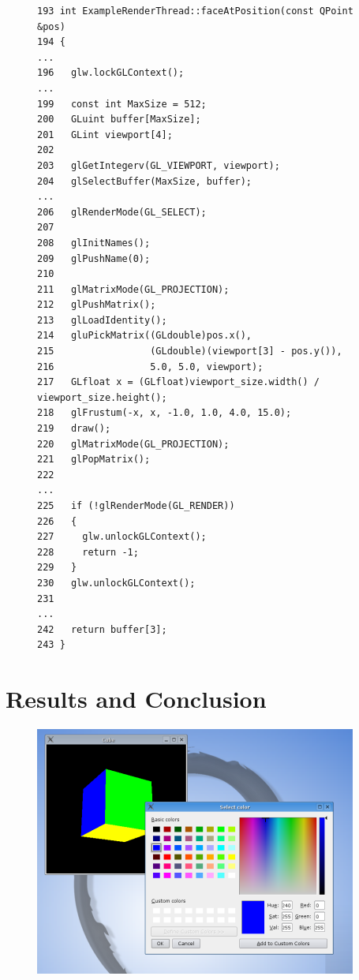 \documentclass[jou,noapacite]{apa}
\begin{document}
\begin{figure}[h]
\begin{lstlisting}[basicstyle=\scriptsize]
193 int ExampleRenderThread::faceAtPosition(const QPoint &pos)
194 {
...
196   glw.lockGLContext();
...
199   const int MaxSize = 512;
200   GLuint buffer[MaxSize];
201   GLint viewport[4];
202
203   glGetIntegerv(GL_VIEWPORT, viewport);
204   glSelectBuffer(MaxSize, buffer);
...
206   glRenderMode(GL_SELECT);
207
208   glInitNames();
209   glPushName(0);
210
211   glMatrixMode(GL_PROJECTION);
212   glPushMatrix();
213   glLoadIdentity();
214   gluPickMatrix((GLdouble)pos.x(),
215                 (GLdouble)(viewport[3] - pos.y()),
216                 5.0, 5.0, viewport);
217   GLfloat x = (GLfloat)viewport_size.width() /               viewport_size.height();
218   glFrustum(-x, x, -1.0, 1.0, 4.0, 15.0);
219   draw();
220   glMatrixMode(GL_PROJECTION);
221   glPopMatrix();
222
...
225   if (!glRenderMode(GL_RENDER))
226   {
227     glw.unlockGLContext();
228     return -1;
229   }
230   glw.unlockGLContext();
231
...
242   return buffer[3];
243 }
\end{lstlisting}
\end{figure}

\section{Results and Conclusion}

\begin{figure}[tbp]
\begin{center}
  \includegraphics[width=.95\linewidth  %
  ]
  {threadedcube_screenshot.png}
  \label{fig:screenshot}
\end{center}
\end{figure}
\end{document}
